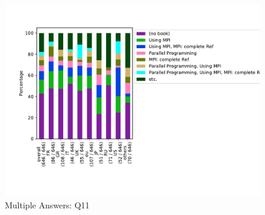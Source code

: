 \begin{figure}[htb]
\begin{center}
\includegraphics[width=14cm]{../pdfs/Q11-mans.pdf}
\caption{Multiple Answers: Q11}
\label{fig:Q11-mans}
\end{center}
\end{figure}


